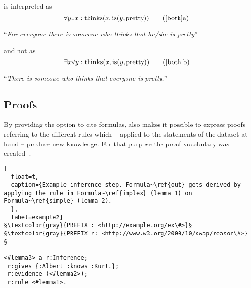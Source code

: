  is interpreted as 
\begin{equation} %
\forall y \exists x : \text{thinks}(x,\text{is}(y,\text{pretty})) \tag{\ref{both}a}
\end{equation}
\begin{center}``\textit{For everyone there is someone who thinks that he/she is pretty}''\end{center}
and not as
\begin{equation} %
\exists x \forall  y : \text{thinks}(x,\text{is}(y,\text{pretty})) \tag{\ref{both}b}
\end{equation}
\begin{center}``\textit{There is someone who thinks that everyone is pretty.}'' \end{center}

% 
\subsection{Proofs}

By providing the option to cite formulas, \nthree also makes it possible to express proofs referring to the different rules which -- applied to the statements
of the dataset at hand 
--
produce new knowledge. %
For that purpose the \nthree
proof vocabulary was created~\cite{Proof}. %

\begin{lstlisting}[
  float=t,
  caption={Example inference step. Formula~\ref{out} gets derived by applying the rule in Formula~\ref{implex} (lemma 1) on Formula~\ref{simple} (lemma 2). 
  },
  label=example2]
§\textcolor{gray}{PREFIX : <http://example.org/ex\#>}§
§\textcolor{gray}{PREFIX r: <http://www.w3.org/2000/10/swap/reason\#>}§

<#lemma3> a r:Inference; 
 r:gives {:Albert :knows :Kurt.}; 
 r:evidence (<#lemma2>);
 r:rule <#lemma1>.
\end{lstlisting}

